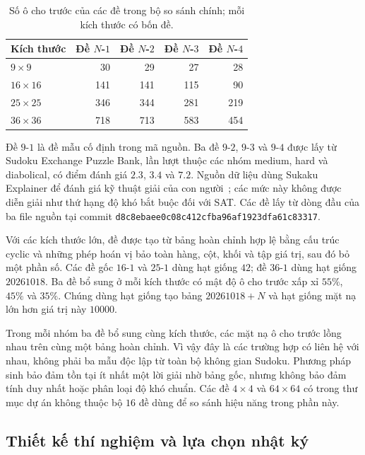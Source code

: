 \documentclass[a4paper,fleqn]{cas-sc}
\begin{document}
\begin{table}[pos=htbp]
 \centering
 \caption{Số ô cho trước của các đề trong bộ so sánh chính; mỗi kích thước có bốn đề.}
 \label{tab:exp-datasets}
 \begin{tabular}{lrrrr}
  \toprule
  Kích thước & Đề $N$-$1$ & Đề $N$-$2$ & Đề $N$-$3$ & Đề $N$-$4$ \\
  \midrule
  $9\times9$ & 30 & 29 & 27 & 28 \\
  $16\times16$ & 141 & 141 & 115 & 90 \\
  $25\times25$ & 346 & 344 & 281 & 219 \\
  $36\times36$ & 718 & 713 & 583 & 454 \\
  \bottomrule
 \end{tabular}
\end{table}

Đề $9$-$1$ là đề mẫu cố định trong mã nguồn. Ba đề $9$-$2$, $9$-$3$
và $9$-$4$ được lấy từ Sudoku Exchange Puzzle Bank, lần lượt thuộc các
nhóm medium, hard và diabolical, có điểm đánh giá $2.3$, $3.4$ và $7.2$.
Nguồn dữ liệu dùng Sukaku Explainer để đánh giá kỹ thuật giải của
con người~; các mức này không được diễn giải như
thứ hạng độ khó bắt buộc đối với SAT. Các đề lấy từ dòng đầu của ba file
nguồn tại commit \texttt{d8c8ebaee0c08c412cfba96af1923dfa61c83317}.

Với các kích thước lớn, đề được tạo từ bảng hoàn chỉnh hợp lệ bằng
cấu trúc cyclic và những phép hoán vị bảo toàn hàng, cột, khối và tập
giá trị, sau đó bỏ một phần số. Các đề gốc $16$-$1$ và $25$-$1$ dùng
hạt giống $42$; đề $36$-$1$ dùng hạt giống $20261018$.
Ba đề bổ sung ở mỗi kích thước có mật độ ô cho trước xấp xỉ
$55\%$, $45\%$ và $35\%$. Chúng dùng hạt giống tạo bảng
$20261018+N$ và hạt giống mặt nạ lớn hơn giá trị này $10000$.

Trong mỗi nhóm ba đề bổ sung cùng kích thước, các mặt nạ ô cho trước
lồng nhau trên cùng một bảng hoàn chỉnh. Vì vậy đây là các trường hợp
có liên hệ với nhau, không phải ba mẫu độc lập từ toàn bộ không gian
Sudoku. Phương pháp sinh bảo đảm tồn tại ít nhất một lời giải nhờ bảng
gốc, nhưng không bảo đảm tính duy nhất hoặc phân loại độ khó chuẩn.
Các đề $4\times4$ và $64\times64$ có trong thư mục dự án không thuộc
bộ $16$ đề dùng để so sánh hiệu năng trong phần này.

\subsection{Thiết kế thí nghiệm và lựa chọn nhật ký}
\end{document}
